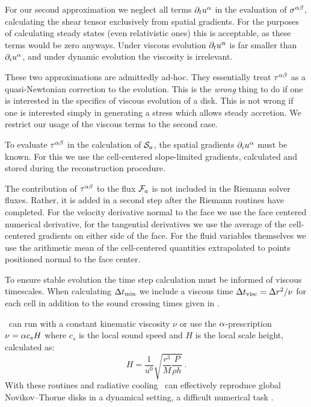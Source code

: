For our second approximation we neglect all terms $\partial_t u^\alpha$ in the evaluation of $\sigma^{\alpha \beta}$, calculating the shear tensor exclusively from spatial gradients.  For the purposes of calculating steady states (even relativistic ones) this is acceptable, as these terms would be zero anyways.  Under viscous evolution $\partial_t u^\alpha$ is far smaller than $\partial_i u^\alpha$, and under dynamic evolution the viscosity is irrelevant. 

These two approximations are admittedly ad-hoc.  They essentially treat $\tau^{\alpha\beta}$ as a quasi-Newtonian correction to the evolution. This is the \emph{wrong} thing to do if one is interested in the specifics of viscous evolution of a disk.  This is not wrong if one is interested simply in generating a stress which allows steady accretion.  We restrict our usage of the viscous terms to the second case.

To evaluate $\tau^{\alpha\beta}$ in the calculation of $\mathcal{S}_a$, the spatial gradients $\partial_i u^\alpha$ must be known.  For this we use the cell-centered slope-limited gradients, calculated and stored during the reconstruction procedure.

The contribution of $\tau^{\alpha\beta}$ to the flux $\mathcal{F}_a$ is not included in the Riemann solver fluxes.  Rather, it is added in a second step after the Riemann routines have completed.  For the velocity derivative normal to the face we use the face centered numerical derivative, for the tangential derivatives we use the average of the cell-centered gradients on either side of the face.  For the fluid variables themselves we use the arithmetic mean of the cell-centered quantities extrapolated to points positioned normal to the face center.

To ensure stable evolution the \CFL time step calculation must be informed of viscous timescales.  When calculating $\Delta t_{\rm min}$ we include a viscous time $\Delta t_{\rm visc} = \Delta r^2 / \nu$ for each cell in addition to the sound crossing times given in .

\grdisco\ can run with a constant kinematic viscosity $\nu$ or use the $\alpha$-prescription $\nu = \alpha c_s H$ where $c_s$ is the local sound speed and $H$ is the local scale height, calculated as:
\begin{equation}
	H = \frac{1}{u^0}\sqrt{\frac{r^3}{M}\frac{P}{\rho h}}\ .
\end{equation}
With these routines and radiative cooling \grdisco\ can effectively reproduce global Novikov--Thorne disks in a dynamical setting, a difficult numerical task \citep{Novikov73}.

